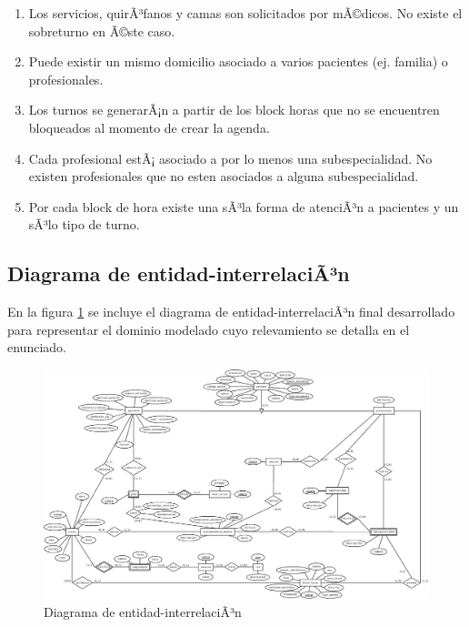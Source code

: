 \documentclass[a4paper,11pt]{article}
\begin{document}
\begin{enumerate}
    \item Los servicios, quirÃ³fanos y camas son solicitados por mÃ©dicos. No existe 
    el sobreturno en Ã©ste caso.
    
    \item Puede existir un mismo domicilio asociado a varios pacientes (ej. familia)
    o profesionales.
    
    \item Los turnos se generarÃ¡n a partir de los block horas que no se encuentren 
    bloqueados al momento de crear la agenda.
    
    \item Cada profesional estÃ¡ asociado a por lo menos una subespecialidad. No existen 
    profesionales que no esten asociados a alguna subespecialidad.
    
    \item Por cada block de hora existe una sÃ³la forma de atenciÃ³n a pacientes y un 
    sÃ³lo tipo de turno.

\end{enumerate}



\subsection{Diagrama de entidad-interrelaciÃ³n}

 En la figura \ref{fig:der} se incluye el diagrama de entidad-interrelaciÃ³n
 final desarrollado para representar el dominio modelado cuyo relevamiento se
 detalla en el enunciado.

\begin{figure}[h!t]
  \centering
  \includegraphics[width=1.4\textwidth, angle=90]{build/images/der.jpeg}
  \caption{Diagrama de entidad-interrelaciÃ³n} \label{fig:der}
\end{figure}
\end{document}
